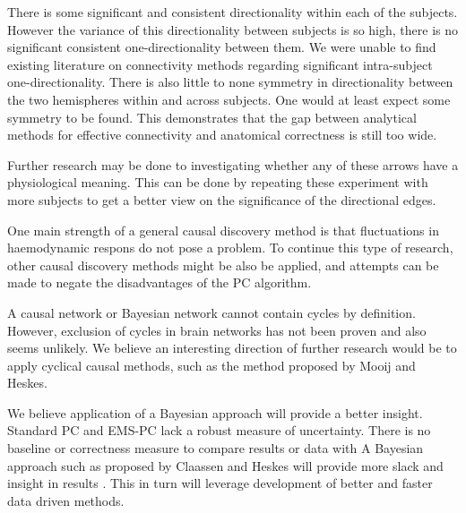 \documentclass[a4paper, 10pt, english, onecolumn]{article}
\begin{document}
There is some significant and consistent directionality within each of the subjects.
However the variance of this directionality between subjects is so high, there is no significant consistent one-directionality between them.
We were unable to find existing literature on connectivity methods regarding significant intra-subject one-directionality.
There is also little to none symmetry in directionality between the two hemispheres within and across subjects.
One would at least expect some symmetry to be found.
This demonstrates that the gap between analytical methods for effective connectivity and anatomical correctness is still too wide.

Further research may be done to investigating whether any of these arrows have a physiological meaning.
This can be done by repeating these experiment with more subjects to get a better view on the significance of the directional edges.

One main strength of a general causal discovery method is that fluctuations in haemodynamic respons do not pose a problem.
To continue this type of research, other causal discovery methods might be also be applied, and attempts can be made to negate the disadvantages of the PC algorithm.

A causal network or Bayesian network cannot contain cycles by definition.
However, exclusion of cycles in brain networks has not been proven and also seems unlikely.
We believe an interesting direction of further research would be to apply cyclical causal methods, such as the method proposed by Mooij and Heskes\cite{Mooij20013}.

We believe application of a Bayesian approach will provide a better insight.
Standard PC and EMS-PC lack a robust measure of uncertainty.
There is no baseline or correctness measure to compare results or data with
A Bayesian approach such as proposed by Claassen and Heskes will provide more slack and insight in results \cite{claassen2012}.
This in turn will leverage development of better and faster data driven methods.






{}

\end{document}
